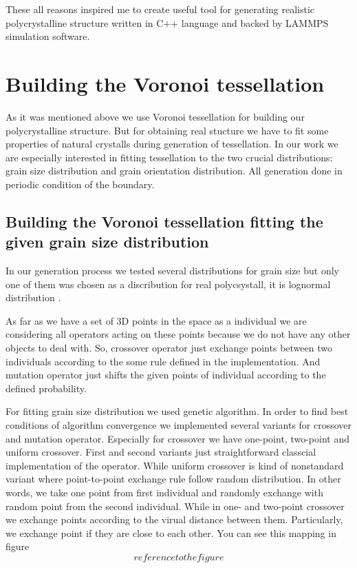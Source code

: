 \documentclass{article}
\begin{document}
These all reasons inspired me to create useful tool for generating realistic polycrystalline structure written in C++ language and backed by LAMMPS simulation software.

\section{Building the Voronoi tessellation}

As it was mentioned above we use Voronoi tessellation for building our polycrystalline structure. But for obtaining real stucture we have to fit some properties of natural crystalls during generation of tessellation. In our work we are especially interested in fitting tessellation to the two crucial distributions: grain size distribution and grain orientation distribution. All generation done in periodic condition of the boundary.

\subsection{Building the Voronoi tessellation fitting the given grain size distribution}

In our generation process we tested several distributions for grain size but only one of them was chosen as a discribution for real polycsystall, it is lognormal distribution \cite{shen15, liu14}.

As far as we have a set of 3D points in the space as a individual we are considering all operators acting on these points because we do not have any other objects to deal with.
So, crossover operator just exchange points between two individuals according to the some rule defined in the implementation. And mutation operator just shifts the given points of individual according to the defined probability.

For fitting grain size distribution we used genetic algorithm. In order to find best conditions of algorithm convergence we implemented several variants for crossover and mutation operator. Especially for crossover we have one-point, two-point and uniform crossover. First and second variants just straightforward classcial implementation of the operator. While uniform crossover is kind of nonstandard variant where point-to-point exchange rule follow random distribution. In other words, we take one point from first individual and randomly exchange with random point from the second individual. While in one- and two-point crossover we exchange points according to the virual distance between  them. Particularly, we exchange point if they are close to each other. You can see this mapping in figure \[reference to the figure\]
\end{document}
